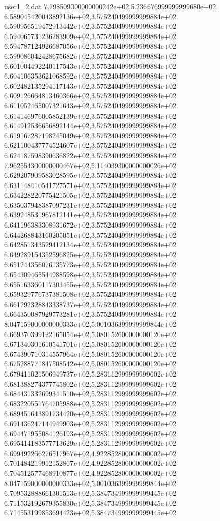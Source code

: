 \begin{filecontents}{user1_2.dat}
7.798509000000000242e+02,5.236676999999999680e+02
6.589045420043892136e+02,3.575240499999999884e+02
6.590956519472913442e+02,3.575240499999999884e+02
6.594065731236283909e+02,3.575240499999999884e+02
6.594787124926687056e+02,3.575240499999999884e+02
6.599086042428675682e+02,3.575240499999999884e+02
6.601004492240117543e+02,3.575240499999999884e+02
6.604106353621068592e+02,3.575240499999999884e+02
6.602482135294117143e+02,3.575240499999999884e+02
6.609126664813460366e+02,3.575240499999999884e+02
6.611052465007321643e+02,3.575240499999999884e+02
6.614146976005852139e+02,3.575240499999999884e+02
6.614912536656892144e+02,3.575240499999999884e+02
6.619167287198245049e+02,3.575240499999999884e+02
6.621100437774524607e+02,3.575240499999999884e+02
6.624187598390636822e+02,3.575240499999999884e+02
7.962554300000000467e+02,5.114039300000000026e+02
6.629207909583028595e+02,3.575240499999999884e+02
6.631148410541727571e+02,3.575240499999999884e+02
6.634228220775421505e+02,3.575240499999999884e+02
6.635037948387097231e+02,3.575240499999999884e+02
6.639248531967812141e+02,3.575240499999999884e+02
6.641196383308931672e+02,3.575240499999999884e+02
6.644268843160205051e+02,3.575240499999999884e+02
6.642851343529412134e+02,3.575240499999999884e+02
6.649289154352596825e+02,3.575240499999999884e+02
6.651244356076135773e+02,3.575240499999999884e+02
6.654309465544988598e+02,3.575240499999999884e+02
6.655163360117303455e+02,3.575240499999999884e+02
6.659329776737381508e+02,3.575240499999999884e+02
6.661292328843338737e+02,3.575240499999999884e+02
6.664350087929773281e+02,3.575240499999999884e+02
8.047159000000000333e+02,5.001036399999999844e+02
6.669370399122165054e+02,5.080152600000000120e+02
6.671340301610541701e+02,5.080152600000000120e+02
6.674390710314557964e+02,5.080152600000000120e+02
6.675288771847508542e+02,5.080152600000000120e+02
6.679411021506949737e+02,5.283112999999999602e+02
6.681388274377745802e+02,5.283112999999999602e+02
6.684431332699341510e+02,5.283112999999999602e+02
6.683220551764705988e+02,5.283112999999999602e+02
6.689451643891734420e+02,5.283112999999999602e+02
6.691436247144949903e+02,5.283112999999999602e+02
6.694471955084126193e+02,5.283112999999999602e+02
6.695414183577713629e+02,5.283112999999999602e+02
6.699492266276517967e+02,4.922852800000000002e+02
6.701484219912152867e+02,4.922852800000000002e+02
6.704512577468910877e+02,4.922852800000000002e+02
8.047159000000000333e+02,5.001036399999999844e+02
6.709532888661301513e+02,5.384734999999999445e+02
6.711532192679355830e+02,5.384734999999999445e+02
6.714553199853694423e+02,5.384734999999999445e+02

\end{filecontents}
